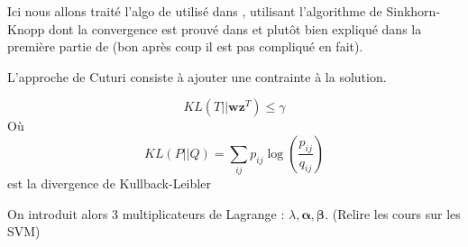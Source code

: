 
Ici nous allons traité l'algo de \cite{Cuturi2013} utilisé dans \cite{Courty2014},
\cite{Courty2015} utilisant 
l'algorithme de Sinkhorn-Knopp dont la convergence est prouvé dans \cite{Sinkhorn1967} et 
plutôt bien expliqué dans la première partie de \cite{Knight2008} 
(bon après coup il est pas compliqué en fait).


L'approche de Cuturi consiste à ajouter une contrainte à la solution.

\begin{equation}
KL(T||\mathbf{wz}^T ) \leq \gamma
\end{equation}
Où
\begin{equation}
KL(P||Q) = \sum_{ij} p_{ij} \log(\frac{p_{ij}}{q_{ij}} )
\end{equation}
est la divergence de Kullback-Leibler

On introduit alors 3 multiplicateurs de Lagrange : $\lambda, \boldsymbol\alpha, \boldsymbol\beta$.
(Relire les cours sur les SVM)

